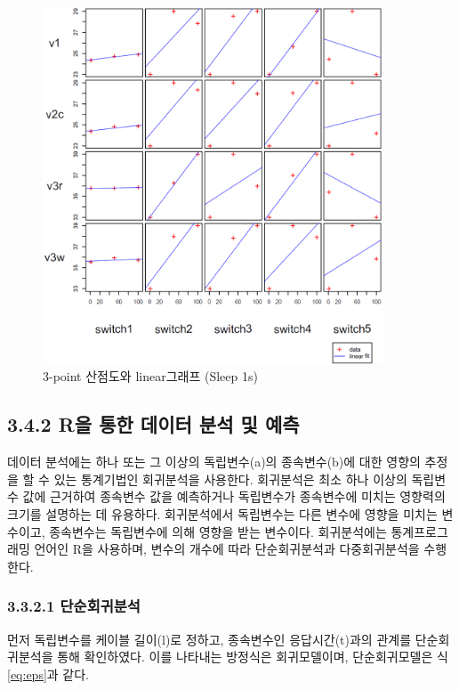 \documentclass[11pt
  , a4paper
  , article
  , oneside
]{memoir}
\begin{document}
\begin{figure}[!htb]
  \centering
  \includegraphics[width=0.9\textwidth]{./images/3point_sleep1s.eps}
  \caption{3-point 산점도와 linear그래프 (Sleep 1s)}
  \label{fig:3ps1}   
\end{figure}

\clearpage

\subsection{3.4.2 R을 통한 데이터 분석 및 예측}
데이터 분석에는 하나 또는 그 이상의 독립변수(a)의 종속변수(b)에 대한 영향의 추정을 할 수 있는 통계기법인 회귀분석을 사용한다\citep{analysis}. 회귀분석은 최소 하나 이상의 독립변수 값에 근거하여 종속변수 값을 예측하거나 독립변수가 종속변수에 미치는 영향력의 크기를 설명하는 데 유용하다. 회귀분석에서 독립변수는 다른 변수에 영향을 미치는 변수이고, 종속변수는 독립변수에 의해 영향을 받는 변수이다. 회귀분석에는 통계프로그래밍 언어인 R을 사용하며, 변수의 개수에 따라 단순회귀분석과 다중회귀분석을 수행한다.
\subsubsection{3.3.2.1 단순회귀분석}
먼저 독립변수를 케이블 길이(l)로 정하고, 종속변수인 응답시간(t)과의 관계를 단순회귀분석을 통해 확인하였다. 이를 나타내는 방정식은 회귀모델이며, 단순회귀모델은 식\ref{eq:eps}과 같다. 
\end{document}
